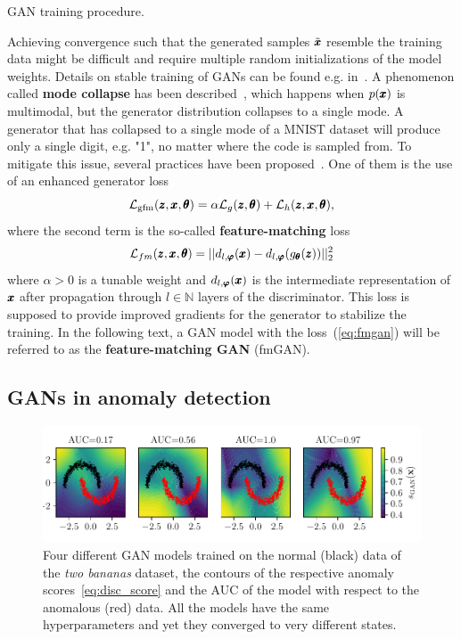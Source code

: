 \begin{algorithm}

\caption{GAN training procedure.}
\label{alg:gan_train}
\end{algorithm}

Achieving convergence such that the generated samples $\tilde{\pmb{{x}}}$ resemble the training data might be difficult and require multiple random initializations of the model weights. Details on stable training of GANs can be found e.g. in~\cite{gui2021review}. A phenomenon called \textbf{mode collapse} has been described~\cite{goodfellow2016nips}, which happens when $p(\pmb{{x}})$ is multimodal, but the generator distribution collapses to a single mode. A generator that has collapsed to a single mode of a MNIST dataset will produce only a single digit, e.g. "1", no matter where the code is sampled from. To mitigate this issue, several practices have been proposed~\cite{salimans2016fmgan,hong2019generative}. One of them is the use of an enhanced generator loss
\begin{equation} \label{eq:fmgan}
\mathcal{L}_{\text{gfm}}(\pmb{{z}},\pmb{{x}},\pmb{{\theta}})=\alpha\mathcal{L}_{g}(\pmb{{z}},\pmb{{\theta}})+\mathcal{L}_{h}(\pmb{{z}},\pmb{{x}},\pmb{{\theta}}),
\end{equation}
where the second term is the so-called \textbf{feature-matching} loss
\begin{equation} \label{eq:fm_loss}
\mathcal{L}_{fm}(\pmb{{z}},\pmb{{x}},\pmb{{\theta}}) = ||d_{l,\pmb{{\varphi}}}(\pmb{{x}})-d_{l,\pmb{{\varphi}}}(g_{\pmb{{\theta}}}(\pmb{{z}}))||_{2}^{2}
\end{equation}
where $\alpha > 0$ is a tunable weight and $d_{l,\pmb{{\varphi}}}(\pmb{{x}})$ is the intermediate representation of $\pmb{{x}}$ after propagation through $l \in \mathbb{N}$ layers of the discriminator. This loss is supposed to provide improved gradients for the generator to stabilize the training. In the following text, a GAN model with the loss~(\ref{eq:fmgan}) will be referred to as the \textbf{feature-matching GAN} (fmGAN).

\subsection{GANs in anomaly detection}
\begin{figure}
\begin{centering}
\includegraphics[scale=0.98]{data/chapter_survey/gan_examples.pdf}
\end{centering}
\caption{Four different GAN models trained on the normal (black) data of the \textit{two bananas} dataset, the contours of the respective anomaly scores~\eqref{eq:disc_score} and the AUC of the model with respect to the anomalous (red) data. All the models have the same hyperparameters and yet they converged to very different states.}
\label{fig:gan_examples}
\end{figure}

